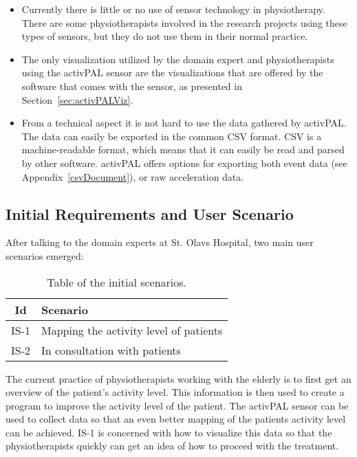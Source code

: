 \begin{itemize}
\item Currently there is little or no use of sensor technology in physiotherapy. There are some physiotherapists involved in the research projects using these types of sensors, but they do not use them in their normal practice. 

\item The only visualization utilized by the domain expert and physiotherapists using the activPAL sensor are the visualizations that are offered by the software that comes with the sensor, as presented in Section~\ref{sec:activPALViz}.

\item From a technical aspect it is not hard to use the data gathered by activPAL. The data can easily be exported in the common CSV format. CSV is a machine-readable format, which means that it can easily be read and parsed by other software. activPAL offers options for exporting both event data (see Appendix~\ref{csvDocument}), or raw acceleration data.

\end{itemize}

\subsection{Initial Requirements and User Scenario}
After talking to the domain experts at St. Olavs Hospital, two main user scenarios emerged:

\begin{table}[!h]
  \centering
  \begin{tabular}{|c|l|}
    \hline
    \textbf{Id} & \textbf{Scenario} \\ \hline
    IS-1 & Mapping the activity level of patients \\ \hline
    IS-2 & In consultation with patients \\ \hline
  \end{tabular}
  \caption{Table of the initial scenarios.}
\end{table}

The current practice of physiotherapists working with the elderly is to first get an overview of the patient's activity level. This information is then used to create a program to improve the activity level of the patient. The activPAL sensor can be used to collect data so that an even better mapping of the patients activity level can be achieved. IS-1 is concerned with how to visualize this data so that the physiotherapists quickly can get an idea of how to proceed with the treatment.


